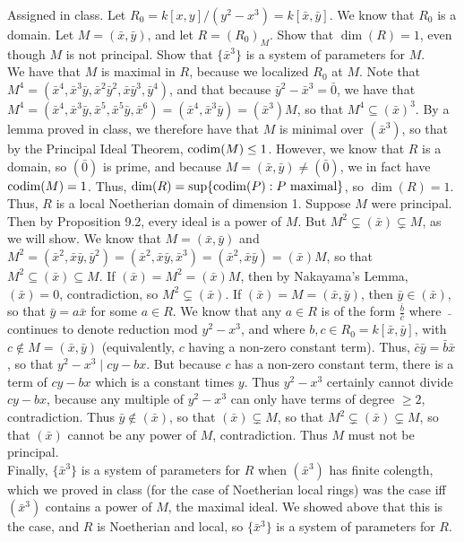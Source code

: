 \documentclass[11pt]{article}
\begin{document}
\num{Assigned in class.} Let $R_0=k[x,y]/(y^2-x^3)=k[\bar{x},\bar{y}]$. We know
that $R_0$ is a domain. Let $M=(\bar{x},\bar{y})$, and let $R=(R_0)_M$. Show
that $\dim(R)=1$, even though $M$ is not principal. Show that $\{\bar{x}^3\}$
is a system of parameters for $M$.\\

We have that $M$ is maximal in $R$,
because we localized $R_0$ at $M$. Note that
$M^4=(\bar{x}^4,\bar{x}^3\bar{y},\bar{x}^2\bar{y}^2,\bar{x}\bar{y}^3,\bar{y}^4)$,
and that because $\bar{y}^2-\bar{x}^3=\bar{0}$, we have that
$M^4=(\bar{x}^4,\bar{x}^3\bar{y},\bar{x}^5,\bar{x}^5\bar{y},\bar{x}^6)=(\bar{x}^4,\bar{x}^3\bar{y})=(\bar{x}^3)M$,
so that $M^4\subseteq(\bar{x})^3$. By a lemma proved in class, we therefore
have that $M$ is minimal over $(\bar{x}^3)$, so that by the Principal
Ideal Theorem, $\operatorname{codim}(M)\leq 1$. However, we know that $R$ is a domain,
so $(\bar{0})$ is prime, and because $M=(\bar{x},\bar{y})\neq(\bar{0})$,
we in fact have $\operatorname{codim}(M)=1$. Thus, $\operatorname{dim}(R)=\sup\{\operatorname{codim}(P):P\text{
maximal}\}$, so $\dim(R)=1$. \\

Thus, $R$ is a local Noetherian domain of dimension 1. Suppose
$M$ were principal. Then by Proposition 9.2, every ideal
is a power of $M$. But $M^2\subsetneq(\bar{x})\subsetneq
M$, as we will show. We know that $M=(\bar{x},\bar{y})$ and
$M^2=(\bar{x}^2,\bar{x}\bar{y},\bar{y}^2)=(\bar{x}^2,\bar{x}\bar{y},\bar{x}^3)=(\bar{x}^2,\bar{x}\bar{y})=(\bar{x})M$,
so that $M^2\subseteq(\bar{x})\subseteq M$. If $(\bar{x})=M^2=(\bar{x})M$,
then by Nakayama's Lemma, $(\bar{x})=0$, contradiction, so
$M^2\subsetneq(\bar{x})$. If $(\bar{x})=M=(\bar{x},\bar{y})$, then
$\bar{y}\in(\bar{x})$, so that $\bar{y}=a\bar{x}$ for some $a\in R$. We
know that any $a\in R$ is of the form $\frac{\bar{b}}{\bar{c}}$ where
$\bar{\text{ }}$ continues to denote reduction mod $y^2-x^3$, and where $b,c\in
R_0=k[\bar{x},\bar{y}]$, with $c\notin M=(\bar{x},\bar{y})$ (equivalently,
$c$ having a non-zero constant term). Thus, $\bar{c}\bar{y}=\bar{b}\bar{x}$,
so that $y^2-x^3\mid cy-bx$. But because $c$ has a non-zero constant term,
there is a term of $cy-bx$ which is a constant times $y$. Thus $y^2-x^3$
certainly cannot divide $cy-bx$, because any multiple of $y^2-x^3$ can only
have terms of degree $\geq 2$, contradiction. Thus $\bar{y}\notin(\bar{x})$,
so that $(\bar{x})\subsetneq M$, so that $M^2\subsetneq(\bar{x})\subsetneq
M$, so that $(\bar{x})$ cannot be any power of $M$, contradiction. Thus $M$
must not be principal.\\

Finally, $\{\bar{x}^3\}$ is a system of parameters for $R$ when $(\bar{x}^3)$
has finite colength, which we proved in class (for the case of Noetherian
local rings) was the case iff $(\bar{x}^3)$ contains a power of $M$, the
maximal ideal. We showed above that this is the case, and $R$ is Noetherian
and local, so $\{\bar{x}^3\}$ is a system of parameters for $R$.
\end{document}
